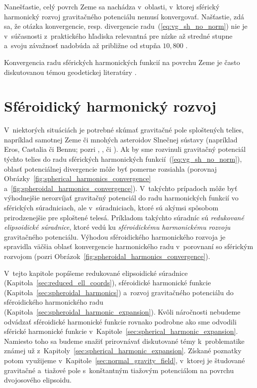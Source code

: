 \documentclass[a4paper,12pt]{book}
\begin{document}
Nanešťastie, celý povrch Zeme sa nachádza v~oblasti, v~ktorej sférický 
harmonický rozvoj gravitačného potenciálu nemusí konvergovať.  Našťastie, zdá 
sa, že otázka konvergencie, resp. divergencie radu~(\ref{eq:vg_sh_no_norm}) nie 
je v~súčasnosti z~praktického hľadiska relevantná pre nízke až stredné stupne 
a~svoju závažnosť nadobúda až približne od stupňa $10{,}800$ 
\parencite{Hirt2016,Rexer2017}.

Konvergencia radu sférických harmonických funkcií na povrchu Zeme je často 
diskutovanou témou geodetickej literatúry 
\parencite{Hotine,Borre_chapter4,MoritzAdvancedGeodesy,Sjoberg1980,Jekeli1983,SansoGeoidDetermination}.







\chapter{Sféroidický harmonický rozvoj}
\label{sec:spheroidal_harmonics_chapter}

V~niektorých situáciách je potrebné skúmať gravitačné pole sploštených telies, 
napríklad samotnej Zeme či mnohých asteroidov Slnečnej sústavy (napríklad Eros, 
Castalia či Bennu; pozri \cite{Garmier2001}, \cite{Hu2015}, \cite{Sebera2016} 
či \cite{Reimond2016}).  Ak by sme rozvinuli gravitačný potenciál týchto telies 
do radu sférických harmonických funkcií~(\ref{eq:vg_sh_no_norm}), oblasť 
potenciálnej divergencie môže byť pomerne rozsiahla (porovnaj 
Obrázky~\ref{fig:spherical_harmonics_convergence} 
a~\ref{fig:spheroidal_harmonics_convergence}).  V~takýchto prípadoch môže byť 
výhodnejšie nerozvíjať gravitačný potenciál do radu harmonických funkcií vo 
sférických súradniciach, ale v~súradniciach, ktoré sú akýmsi spôsobom 
prirodzenejšie pre sploštené telesá.  Príkladom takýchto súradníc sú 
\emph{redukované elipsoidické súradnice}, ktoré vedú ku \emph{sféroidickému 
harmonickému rozvoju} gravitačného potenciálu.  Výhodou sféroidického 
harmonického rozvoja je spravidla väčšia oblasť konvergencie harmonického radu 
v~porovnaní so sférickým rozvojom (pozri 
Obrázok~\ref{fig:spheroidal_harmonics_convergence}).

V~tejto kapitole popíšeme redukované elipsoidické súradnice 
(Kapitola~\ref{sec:reduced_ell_coords}), sféroidické harmonické funkcie 
(Kapitola~\ref{sec:spheroidal_harmonics}) a~rozvoj gravitačného potenciálu do 
sféroidického harmonického radu 
(Kapitola~\ref{sec:spheroidal_harmonic_expansion}).  Kvôli náročnosti nebudeme 
odvádzať sféroidické harmonické funkcie rovnako podrobne ako sme odvodili 
sférické harmonické funkcie v~Kapitole~\ref{sec:spherical_harmonic_expansion}.  
Namiesto toho sa budeme snažiť prirovnávať diskutované témy k~problematike 
známej už z~Kapitoly~\ref{sec:spherical_harmonic_expansion}.  Získané poznatky 
potom využijeme v~Kapitole~\ref{sec:normal_gravity_field}, v~ktorej je 
študované gravitačné a~tiažové pole s~konštantným tiažovým potenciálom na 
povrchu dvojosového elipsoidu.
\end{document}
